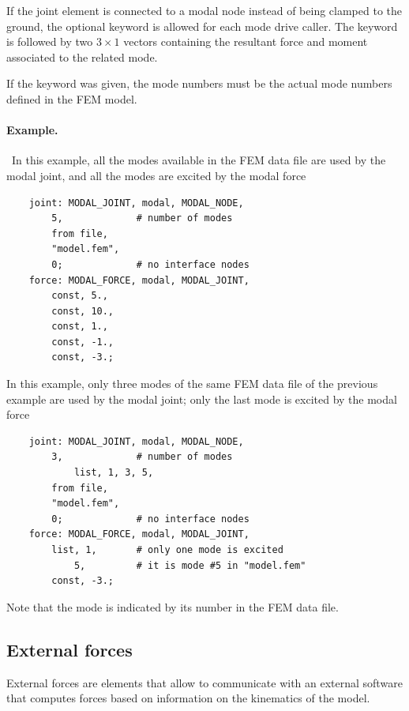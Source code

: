 If the  joint element is connected to a modal node
instead of being clamped to the ground, the optional keyword 
is allowed for each mode drive caller.
The keyword  is followed by two $3\times 1$ vectors
containing the resultant force and moment associated to the related mode.

If the keyword  was given, the mode numbers must be
the actual mode numbers defined in the FEM model.

\paragraph{Example.} \
In this example, all the modes available in the FEM data file 
are used by the modal joint, and all the modes are excited
by the modal force
\begin{verbatim}
    joint: MODAL_JOINT, modal, MODAL_NODE,
        5,             # number of modes
        from file,
        "model.fem",
        0;             # no interface nodes
    force: MODAL_FORCE, modal, MODAL_JOINT,
        const, 5.,
        const, 10.,
        const, 1.,
        const, -1.,
        const, -3.;
\end{verbatim}

In this example, only three modes of the same FEM data file
of the previous example are used by the modal joint;
only the last mode is excited by the modal force
\begin{verbatim}
    joint: MODAL_JOINT, modal, MODAL_NODE,
        3,             # number of modes
            list, 1, 3, 5,
        from file,
        "model.fem",
        0;             # no interface nodes
    force: MODAL_FORCE, modal, MODAL_JOINT,
        list, 1,       # only one mode is excited
            5,         # it is mode #5 in "model.fem"
        const, -3.;
\end{verbatim}
Note that the mode is indicated by its number in the FEM data file.




\subsection{External forces}
External forces are elements that allow to communicate
with an external software that computes forces
based on information on the kinematics of the model.

